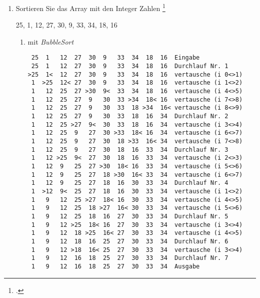 \documentclass{bschlangaul-aufgabe}
\begin{document}

\begin{enumerate}


\item Sortieren Sie das Array mit den Integer Zahlen
\footcite{examen:46115:2016:03}
\begin{center}
25, 1, 12, 27, 30, 9, 33, 34, 18, 16
\end{center}

\begin{enumerate}


\item mit \emph{BubbleSort}

\begin{bAntwort}
\footnotesize
\begin{verbatim}
 25  1   12  27  30  9   33  34  18  16  Eingabe
 25  1   12  27  30  9   33  34  18  16  Durchlauf Nr. 1
>25  1<  12  27  30  9   33  34  18  16  vertausche (i 0<>1)
 1  >25  12< 27  30  9   33  34  18  16  vertausche (i 1<>2)
 1   12  25  27 >30  9<  33  34  18  16  vertausche (i 4<>5)
 1   12  25  27  9   30  33 >34  18< 16  vertausche (i 7<>8)
 1   12  25  27  9   30  33  18 >34  16< vertausche (i 8<>9)
 1   12  25  27  9   30  33  18  16  34  Durchlauf Nr. 2
 1   12  25 >27  9<  30  33  18  16  34  vertausche (i 3<>4)
 1   12  25  9   27  30 >33  18< 16  34  vertausche (i 6<>7)
 1   12  25  9   27  30  18 >33  16< 34  vertausche (i 7<>8)
 1   12  25  9   27  30  18  16  33  34  Durchlauf Nr. 3
 1   12 >25  9<  27  30  18  16  33  34  vertausche (i 2<>3)
 1   12  9   25  27 >30  18< 16  33  34  vertausche (i 5<>6)
 1   12  9   25  27  18 >30  16< 33  34  vertausche (i 6<>7)
 1   12  9   25  27  18  16  30  33  34  Durchlauf Nr. 4
 1  >12  9<  25  27  18  16  30  33  34  vertausche (i 1<>2)
 1   9   12  25 >27  18< 16  30  33  34  vertausche (i 4<>5)
 1   9   12  25  18 >27  16< 30  33  34  vertausche (i 5<>6)
 1   9   12  25  18  16  27  30  33  34  Durchlauf Nr. 5
 1   9   12 >25  18< 16  27  30  33  34  vertausche (i 3<>4)
 1   9   12  18 >25  16< 27  30  33  34  vertausche (i 4<>5)
 1   9   12  18  16  25  27  30  33  34  Durchlauf Nr. 6
 1   9   12 >18  16< 25  27  30  33  34  vertausche (i 3<>4)
 1   9   12  16  18  25  27  30  33  34  Durchlauf Nr. 7
 1   9   12  16  18  25  27  30  33  34  Ausgabe
\end{verbatim}
\end{bAntwort}


\end{enumerate}
\end{enumerate}
\end{document}
